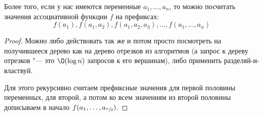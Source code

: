 	\begin{lemma}
		Более того, если у нас имеются переменные $a_1, \dots, a_n$, то можно посчитать значения ассоциативной функции $f$ на префиксах:
		\[ f(a_1), f(a_1, a_2), f(a_1, a_2, a_3), \dots, f(a_1, \dots, a_n) \]
	\end{lemma}
	\begin{proof}
		Можно либо действовать так же и потом просто посмотреть на получившееся дерево как на дерево отрезков из алгоритмов (а запрос к дереву отрезков "--- это $\O(\log n)$ запросов к его вершинам),
		либо применить разделяй-и-властвуй.

		Для этого рекурсивно считаем префиксные значения для первой половины переменных, для второй, а потом ко всем значениям из второй половины дописываем в начало
		$f(a_1, \dots, a_{\sfrac n2})$.
	\end{proof}

